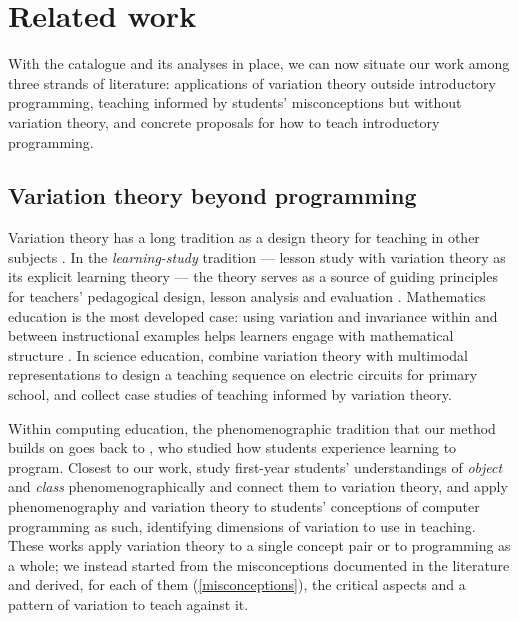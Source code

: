 \mode*
\section{Related work}
\label{relatedwork}

With the catalogue and its analyses in place, we can now situate our work among
three strands of literature: applications of variation theory outside
introductory programming, teaching informed by students' misconceptions but
without variation theory, and concrete proposals for how to teach introductory
programming.

\subsection{Variation theory beyond programming}

Variation theory has a long tradition as a design theory for teaching in other
subjects \autocite{MartonPang2006Conditions}. In the \emph{learning-study}
tradition --- lesson study with
variation theory as its explicit learning theory --- the theory serves as a
source of guiding principles for teachers' pedagogical design, lesson analysis
and evaluation \autocite{PangLing2011LearningStudy}. Mathematics education is
the most developed case: using variation and invariance within and between
instructional examples helps learners engage with mathematical structure
\autocite{Kullberg2017VTMathematics}. In science education,
\textcite{Preston2022ElectricityVT} combine variation theory with multimodal
representations to design a teaching sequence on electric circuits for primary
school, and \textcite{Kullberg2024PlanningTeaching} collect case studies of
teaching informed by variation theory.

Within computing education, the phenomenographic tradition that our method
builds on goes back to \textcite{Booth1992Phenomenographic}, who studied how
students experience learning to program. Closest to our work,
\textcite{EckerdalThune2005ObjectsVT} study first-year students' understandings
of \emph{object} and \emph{class} phenomenographically and connect them to
variation theory, and \textcite{ThuneEckerdal2009ConceptionsVT} apply
phenomenography and variation theory to students' conceptions of computer
programming as such, identifying dimensions of variation to use in teaching.
These works apply variation theory to a single concept pair or to programming
as a whole; we instead started from the misconceptions documented in the
literature and derived, for each of them (\cref{misconceptions}), the critical
aspects and a pattern of variation to teach against it.

